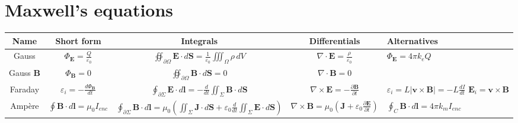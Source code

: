 \documentclass{form}
\begin{document}
\section*{Maxwell's equations}
\vspace*{-1em}
\begin{center}
	{ \small
	\begin{tabular}{c | c | c | c | p{39mm}}
		\textbf{Name} & \textbf{Short form} & \textbf{Integrals} & \textbf{Differentials} & \textbf{Alternatives} \\ \hline
		Gauss & $\displaystyle \Phi_{\mathbf{E}}=\frac{Q}{\varepsilon_0}$ & $\displaystyle \oiint_{\partial \Omega}{\mathbf{E}\cdot d\mathbf{S}}=\frac{1}{\varepsilon_0}\iiint_{\Omega}{\rho}\,dV$ & $\displaystyle \nabla \cdot \mathbf{E} = \frac{\rho}{\varepsilon_0} $ & $\Phi_{\mathbf{E}}=4\pi k_e Q$ \\
		Gauss $\mathbf{B}$ & $\displaystyle \Phi_{\mathbf{B}} = 0$ & $\displaystyle \oiint_{\partial \Omega}{\mathbf{B}\cdot d\mathbf{S}}=0$ & $\displaystyle \nabla \cdot \mathbf{B} = 0$ \\
		Faraday & $\displaystyle \varepsilon_i = -\frac{d\Phi_{\mathbf{B}}}{dt}$ & $\displaystyle \oint_{\partial \Sigma}{\mathbf{E}\cdot d\mathbf{l}}=-\frac{d}{dt}\iint_\Sigma {\mathbf{B}\cdot d\mathbf{S}}$ & $\displaystyle \nabla \times \mathbf{E} = -\frac{\partial \mathbf{B}}{\partial t}$ & ${\displaystyle \varepsilon_i=L|\mathbf{v}\times\mathbf{B}|=-L\frac{dI}{dt}}$ ${\mathbf{E}_i = \mathbf{v}\times\mathbf{B}}$ \\
		Ampère & $\displaystyle \oint{\mathbf{B} \cdot d\mathbf{l}}=\mu_0 I_{enc}$ & $\displaystyle \oint_{\partial \Sigma}{\mathbf{B} \cdot d\mathbf{l}}=\mu_0\left(\iint_\Sigma {\mathbf{J} \cdot d\mathbf{S}}+\varepsilon_0 \frac{d}{dt} \iint_\Sigma {\mathbf{E} \cdot d\mathbf{S}}\right)$ & $\displaystyle \nabla \times \mathbf{B} = \mu_0\left(\mathbf{J}+\varepsilon_0 \frac{\partial \mathbf{E}}{\partial t}\right)$ & $\displaystyle \oint_{C}{\mathbf{B}\cdot d\mathbf{l}}=4\pi k_m I_{enc}$
	\end{tabular}
	}
\end{center}
\vspace*{-1.5em}
\end{document}
